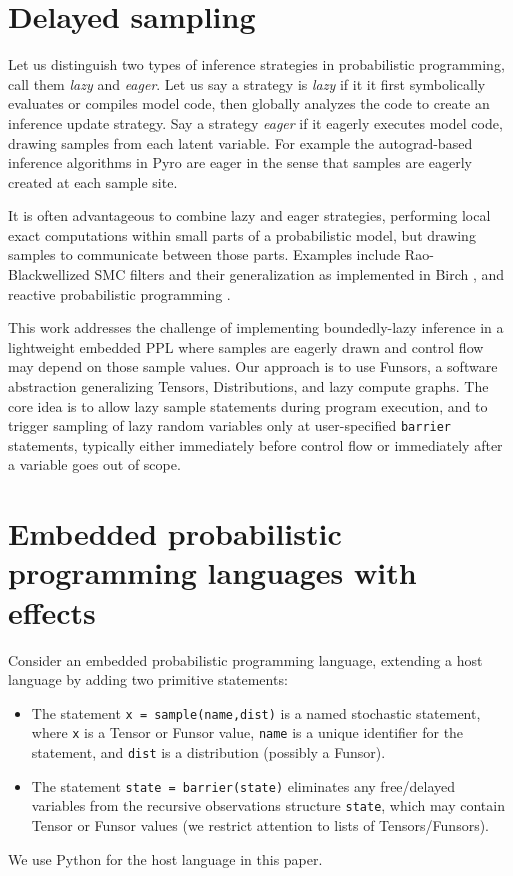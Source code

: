 \documentclass[anonymous=false, %
               format=acmsmall, %
               review=true, %
               screen=true, %
               nonacm=true]{acmart}
\begin{document}
\section{Delayed sampling}

Let us distinguish two types of inference strategies in probabilistic programming, call them \emph{lazy} and \emph{eager}.
Let us say a strategy is \emph{lazy} if it it first symbolically evaluates or compiles model code, then globally analyzes the code to create an inference update strategy.
Say a strategy \emph{eager} if it eagerly executes model code, drawing samples from each latent variable.
For example the autograd-based inference algorithms in Pyro are eager in the sense that samples are eagerly created at each sample site.

It is often advantageous to combine lazy and eager strategies, performing local exact computations within small parts of a probabilistic model, but drawing samples to communicate between those parts.
Examples include Rao-Blackwellized SMC filters and their generalization as implemented in Birch \cite{murray2017delayed}, and reactive probabilistic programming \cite{baudart2019reactive}.

This work addresses the challenge of implementing boundedly-lazy inference in a lightweight embedded PPL where samples are eagerly drawn and control flow may depend on those sample values.
Our approach is to use Funsors, a software abstraction generalizing Tensors, Distributions, and lazy compute graphs.
The core idea is to allow lazy sample statements during program execution, and to trigger sampling of lazy random variables only at user-specified \verb$barrier$ statements, typically either immediately before control flow or immediately after a variable goes out of scope.

\section{Embedded probabilistic programming languages with effects}

Consider an embedded probabilistic programming language, extending a host language by adding two primitive statements:
\begin{itemize}
  \item The statement \verb$x = sample(name,dist)$ is a named stochastic statement, where \verb$x$ is a Tensor or Funsor value, \verb$name$ is a unique identifier for the statement, and \verb$dist$ is a distribution (possibly a Funsor).
  \item The statement \verb$state = barrier(state)$ eliminates any free/delayed variables from the recursive observations structure \verb$state$, which may contain Tensor or Funsor values (we restrict attention to lists of Tensors/Funsors).
\end{itemize}
We use Python for the host language in this paper.
\end{document}
